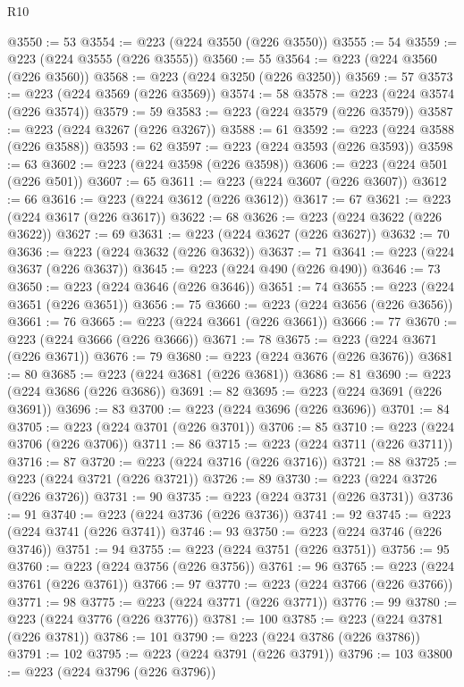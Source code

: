 \begin{lexlean}{R10}
\begin{coremodule}
@3550 := 53
@3554 := @223 (@224 @3550 (@226 @3550))
@3555 := 54
@3559 := @223 (@224 @3555 (@226 @3555))
@3560 := 55
@3564 := @223 (@224 @3560 (@226 @3560))
@3568 := @223 (@224 @3250 (@226 @3250))
@3569 := 57
@3573 := @223 (@224 @3569 (@226 @3569))
@3574 := 58
@3578 := @223 (@224 @3574 (@226 @3574))
@3579 := 59
@3583 := @223 (@224 @3579 (@226 @3579))
@3587 := @223 (@224 @3267 (@226 @3267))
@3588 := 61
@3592 := @223 (@224 @3588 (@226 @3588))
@3593 := 62
@3597 := @223 (@224 @3593 (@226 @3593))
@3598 := 63
@3602 := @223 (@224 @3598 (@226 @3598))
@3606 := @223 (@224 @501 (@226 @501))
@3607 := 65
@3611 := @223 (@224 @3607 (@226 @3607))
@3612 := 66
@3616 := @223 (@224 @3612 (@226 @3612))
@3617 := 67
@3621 := @223 (@224 @3617 (@226 @3617))
@3622 := 68
@3626 := @223 (@224 @3622 (@226 @3622))
@3627 := 69
@3631 := @223 (@224 @3627 (@226 @3627))
@3632 := 70
@3636 := @223 (@224 @3632 (@226 @3632))
@3637 := 71
@3641 := @223 (@224 @3637 (@226 @3637))
@3645 := @223 (@224 @490 (@226 @490))
@3646 := 73
@3650 := @223 (@224 @3646 (@226 @3646))
@3651 := 74
@3655 := @223 (@224 @3651 (@226 @3651))
@3656 := 75
@3660 := @223 (@224 @3656 (@226 @3656))
@3661 := 76
@3665 := @223 (@224 @3661 (@226 @3661))
@3666 := 77
@3670 := @223 (@224 @3666 (@226 @3666))
@3671 := 78
@3675 := @223 (@224 @3671 (@226 @3671))
@3676 := 79
@3680 := @223 (@224 @3676 (@226 @3676))
@3681 := 80
@3685 := @223 (@224 @3681 (@226 @3681))
@3686 := 81
@3690 := @223 (@224 @3686 (@226 @3686))
@3691 := 82
@3695 := @223 (@224 @3691 (@226 @3691))
@3696 := 83
@3700 := @223 (@224 @3696 (@226 @3696))
@3701 := 84
@3705 := @223 (@224 @3701 (@226 @3701))
@3706 := 85
@3710 := @223 (@224 @3706 (@226 @3706))
@3711 := 86
@3715 := @223 (@224 @3711 (@226 @3711))
@3716 := 87
@3720 := @223 (@224 @3716 (@226 @3716))
@3721 := 88
@3725 := @223 (@224 @3721 (@226 @3721))
@3726 := 89
@3730 := @223 (@224 @3726 (@226 @3726))
@3731 := 90
@3735 := @223 (@224 @3731 (@226 @3731))
@3736 := 91
@3740 := @223 (@224 @3736 (@226 @3736))
@3741 := 92
@3745 := @223 (@224 @3741 (@226 @3741))
@3746 := 93
@3750 := @223 (@224 @3746 (@226 @3746))
@3751 := 94
@3755 := @223 (@224 @3751 (@226 @3751))
@3756 := 95
@3760 := @223 (@224 @3756 (@226 @3756))
@3761 := 96
@3765 := @223 (@224 @3761 (@226 @3761))
@3766 := 97
@3770 := @223 (@224 @3766 (@226 @3766))
@3771 := 98
@3775 := @223 (@224 @3771 (@226 @3771))
@3776 := 99
@3780 := @223 (@224 @3776 (@226 @3776))
@3781 := 100
@3785 := @223 (@224 @3781 (@226 @3781))
@3786 := 101
@3790 := @223 (@224 @3786 (@226 @3786))
@3791 := 102
@3795 := @223 (@224 @3791 (@226 @3791))
@3796 := 103
@3800 := @223 (@224 @3796 (@226 @3796))

\end{coremodule}
\end{lexlean}
